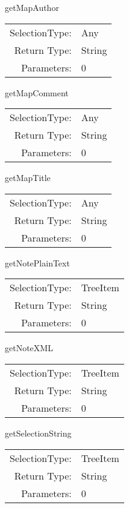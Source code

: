 \item getMapAuthor\\
\begin{tabular}{rl}
  SelectionType: & Any\\
    Return Type: & String\\
     Parameters: & 0\\
\end{tabular}

\item getMapComment\\
\begin{tabular}{rl}
  SelectionType: & Any\\
    Return Type: & String\\
     Parameters: & 0\\
\end{tabular}

\item getMapTitle\\
\begin{tabular}{rl}
  SelectionType: & Any\\
    Return Type: & String\\
     Parameters: & 0\\
\end{tabular}

\item getNotePlainText\\
\begin{tabular}{rl}
  SelectionType: & TreeItem\\
    Return Type: & String\\
     Parameters: & 0\\
\end{tabular}

\item getNoteXML\\
\begin{tabular}{rl}
  SelectionType: & TreeItem\\
    Return Type: & String\\
     Parameters: & 0\\
\end{tabular}

\item getSelectionString\\
\begin{tabular}{rl}
  SelectionType: & TreeItem\\
    Return Type: & String\\
     Parameters: & 0\\
\end{tabular}

